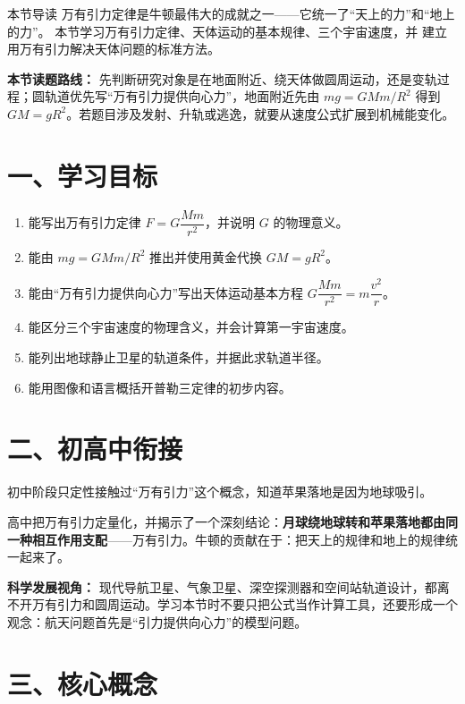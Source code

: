 
\begin{learningbox}{本节导读}
万有引力定律是牛顿最伟大的成就之一——它统一了“天上的力”和“地上的力”。
本节学习万有引力定律、天体运动的基本规律、三个宇宙速度，并
建立用万有引力解决天体问题的标准方法。
\end{learningbox}

\textbf{本节读题路线：} 先判断研究对象是在地面附近、绕天体做圆周运动，还是变轨过程；圆轨道优先写“万有引力提供向心力”，地面附近先由 $mg=GMm/R^2$ 得到 $GM=gR^2$。若题目涉及发射、升轨或逃逸，就要从速度公式扩展到机械能变化。

\section*{一、学习目标}

\begin{enumerate}
  \item 能写出万有引力定律 $F = G\dfrac{Mm}{r^2}$，并说明 $G$ 的物理意义。
  \item 能由 $mg=GMm/R^2$ 推出并使用黄金代换 $GM = gR^2$。
  \item 能由“万有引力提供向心力”写出天体运动基本方程 $G\dfrac{Mm}{r^2} = m\dfrac{v^2}{r}$。
  \item 能区分三个宇宙速度的物理含义，并会计算第一宇宙速度。
  \item 能列出地球静止卫星的轨道条件，并据此求轨道半径。
  \item 能用图像和语言概括开普勒三定律的初步内容。
\end{enumerate}
\section*{二、初高中衔接}

初中阶段只定性接触过“万有引力”这个概念，知道苹果落地是因为地球吸引。

高中把万有引力定量化，并揭示了一个深刻结论：\textbf{月球绕地球转和苹果落地都由同一种相互作用支配}——万有引力。牛顿的贡献在于：把天上的规律和地上的规律统一起来了。

\textbf{科学发展视角：} 现代导航卫星、气象卫星、深空探测器和空间站轨道设计，都离不开万有引力和圆周运动。学习本节时不要只把公式当作计算工具，还要形成一个观念：航天问题首先是“引力提供向心力”的模型问题。

\section*{三、核心概念}

